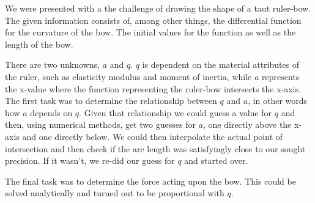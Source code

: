 We were presented with a the challenge of drawing the shape of a taut ruler-bow. The given information consists of, among other things, the differential function for the curvature of the bow. The initial values for the function as well as the length of the bow.

There are two unknowns, $a$ and $q$. $q$ is dependent on the material attributes of the ruler, such as elasticity modulus and moment of inertia, while $a$ represents the x-value where the function representing the ruler-bow intersects the x-axis. The first task was to determine the relationship between $q$ and $a$, in other words how $a$ depends on $q$. Given that relationship we could guess a value for $q$ and then, using numerical methods, get two guesses for $a$, one directly above the x-axis and one directly below. We could then interpolate the actual point of intersection and then check if the arc length was satisfyingly close to our sought precision. If it wasn't, we re-did our guess for $q$ and started over.

The final task was to determine the force acting upon the bow. This could be solved analytically and turned out to be proportional with $q$.